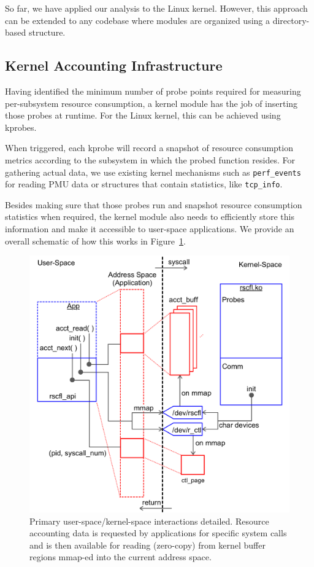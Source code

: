 \documentclass[letterpaper,twocolumn,10pt]{article}
\begin{document}
So far, we have applied our analysis to the Linux kernel. However, this
approach can be extended to any codebase where modules are organized using a
directory-based structure.


\subsection{Kernel Accounting Infrastructure}

Having identified the minimum number of probe points required for measuring per-subsystem
resource consumption, a kernel module has the job of inserting those probes at runtime.
For the Linux kernel, this can be achieved using kprobes.

When triggered, each kprobe will record a snapshot of resource consumption metrics according
to the subsystem in which the probed function resides. For gathering actual data, we
use existing kernel mechanisms such as \texttt{perf\_events} for reading PMU
data or structures that contain statistics, like \texttt{tcp\_info}.

Besides making sure that those probes run and snapshot resource consumption statistics
when required, the kernel module also needs to efficiently store this information
and make it accessible to user-space applications. We provide an overall schematic of
how this works in Figure~\ref{fig:design}.

\begin{figure}[ht!] 
	\centering
	\hspace*{-0.05\columnwidth} 
	\includegraphics[width=1.1\columnwidth]{sys_design}
	\caption{Primary user-space/kernel-space interactions detailed. Resource
accounting data is requested by applications for specific system calls and is
then available for reading (zero-copy) from kernel buffer regions mmap-ed into
the current address space. } 
	\label{fig:design}
\end{figure}
\end{document}
